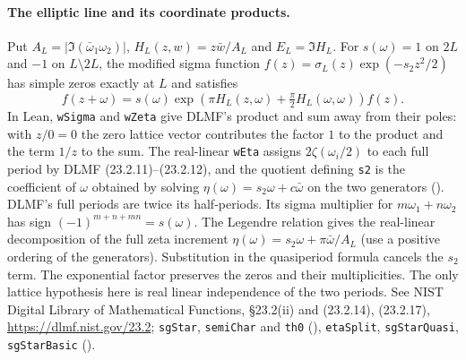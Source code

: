 \paragraph{The elliptic line and its coordinate products.}
\label{r16:ktheta-line}
Put $A_L=|\Im(\bar\omega_1\omega_2)|$,
$H_L(z,w)=z\bar w/A_L$ and $E_L=\Im H_L$.
For $s(\omega)=1$ on $2L$ and $-1$ on $L\setminus 2L$,
the modified sigma function $f(z)=\sigma_L(z)\exp(-s_2 z^2/2)$
has simple zeros exactly at $L$ and satisfies
\[
 f(z+\omega)=s(\omega)
   \exp\!\left(\pi H_L(z,\omega)+\tfrac\pi2 H_L(\omega,\omega)\right)f(z).
\]
In Lean, \nolinkurl{wSigma} and \nolinkurl{wZeta} give DLMF's product
and sum away from their poles: with $z/0=0$ the zero lattice vector
contributes the factor $1$ to the product and the term $1/z$ to the sum.
The real-linear \nolinkurl{wEta} assigns $2\zeta(\omega_i/2)$ to each
full period by DLMF (23.2.11)--(23.2.12), and the quotient defining
\nolinkurl{s2} is the coefficient of $\omega$ obtained by solving
$\eta(\omega)=s_2\omega+c\bar\omega$ on the two generators
().
DLMF's full periods are twice its half-periods. Its sigma
multiplier for $m\omega_1+n\omega_2$ has sign $(-1)^{m+n+mn}=s(\omega)$.
The Legendre relation gives the real-linear decomposition of the full
zeta increment $\eta(\omega)=s_2\omega+\pi\bar\omega/A_L$
(use a positive ordering of the generators). Substitution in the
quasiperiod formula cancels the $s_2$ term. The exponential factor
preserves the zeros and their multiplicities. The only lattice
hypothesis here is real linear independence of the two periods.
See NIST Digital Library of Mathematical Functions, \S23.2(ii)
and (23.2.14), (23.2.17), \url{https://dlmf.nist.gov/23.2};
\nolinkurl{sgStar}, \nolinkurl{semiChar} and \nolinkurl{th0}
(),
\nolinkurl{etaSplit}, \nolinkurl{sgStarQuasi}, \nolinkurl{sgStarBasic}
().

